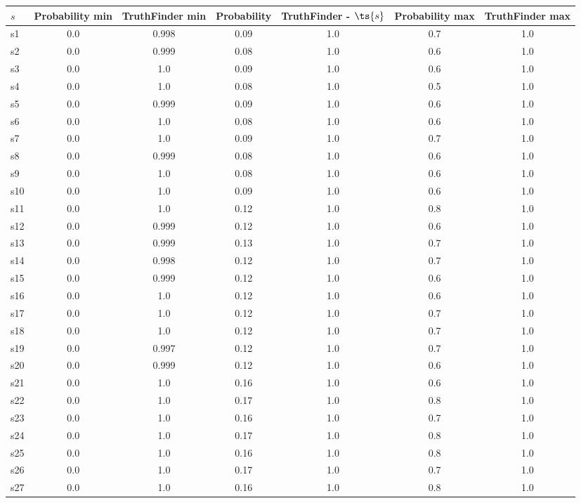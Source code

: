 \documentclass{article}
\begin{document}
\noindent\begin{tabular}{|l|c|c|c|c|c|c|}
\hline
$s$& Probability min & TruthFinder min & Probability & TruthFinder - $\ts{s}$ & Probability max & TruthFinder max\\
\hline
s1 &0.0 & 0.998 & 0.09 & 1.0 & 0.7 & 1.0\\
\hline
s2 &0.0 & 0.999 & 0.08 & 1.0 & 0.6 & 1.0\\
\hline
s3 &0.0 & 1.0 & 0.09 & 1.0 & 0.6 & 1.0\\
\hline
s4 &0.0 & 1.0 & 0.08 & 1.0 & 0.5 & 1.0\\
\hline
s5 &0.0 & 0.999 & 0.09 & 1.0 & 0.6 & 1.0\\
\hline
s6 &0.0 & 1.0 & 0.08 & 1.0 & 0.6 & 1.0\\
\hline
s7 &0.0 & 1.0 & 0.09 & 1.0 & 0.7 & 1.0\\
\hline
s8 &0.0 & 0.999 & 0.08 & 1.0 & 0.6 & 1.0\\
\hline
s9 &0.0 & 1.0 & 0.08 & 1.0 & 0.6 & 1.0\\
\hline
s10 &0.0 & 1.0 & 0.09 & 1.0 & 0.6 & 1.0\\
\hline
s11 &0.0 & 1.0 & 0.12 & 1.0 & 0.8 & 1.0\\
\hline
s12 &0.0 & 0.999 & 0.12 & 1.0 & 0.6 & 1.0\\
\hline
s13 &0.0 & 0.999 & 0.13 & 1.0 & 0.7 & 1.0\\
\hline
s14 &0.0 & 0.998 & 0.12 & 1.0 & 0.7 & 1.0\\
\hline
s15 &0.0 & 0.999 & 0.12 & 1.0 & 0.6 & 1.0\\
\hline
s16 &0.0 & 1.0 & 0.12 & 1.0 & 0.6 & 1.0\\
\hline
s17 &0.0 & 1.0 & 0.12 & 1.0 & 0.7 & 1.0\\
\hline
s18 &0.0 & 1.0 & 0.12 & 1.0 & 0.7 & 1.0\\
\hline
s19 &0.0 & 0.997 & 0.12 & 1.0 & 0.7 & 1.0\\
\hline
s20 &0.0 & 0.999 & 0.12 & 1.0 & 0.6 & 1.0\\
\hline
s21 &0.0 & 1.0 & 0.16 & 1.0 & 0.6 & 1.0\\
\hline
s22 &0.0 & 1.0 & 0.17 & 1.0 & 0.8 & 1.0\\
\hline
s23 &0.0 & 1.0 & 0.16 & 1.0 & 0.7 & 1.0\\
\hline
s24 &0.0 & 1.0 & 0.17 & 1.0 & 0.8 & 1.0\\
\hline
s25 &0.0 & 1.0 & 0.16 & 1.0 & 0.8 & 1.0\\
\hline
s26 &0.0 & 1.0 & 0.17 & 1.0 & 0.7 & 1.0\\
\hline
s27 &0.0 & 1.0 & 0.16 & 1.0 & 0.8 & 1.0\\

\end{tabular}
\end{document}
